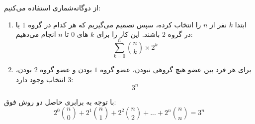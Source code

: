 \p
از دوگانه‌شماری استفاده می‌کنیم:
    \begin{enumerate}
        \item 
        ابتدا
$k$
         نفر از
$n$
          را انتخاب کرده، سپس تصمیم می‌گیریم که هر کدام در گروه 
$1$
         یا در گروه
$2$ 
    باشند. این کار را برای
$k$
         ‌های 
$0$ 
          تا
$n$ 
         انجام می‌دهیم:
        $$\sum_{k=0}^{n} {\binom{n}{k}\times2^k}$$
        \item
       برای هر فرد بین عضو هیچ گروهی نبودن، عضو گروه 
$1$ 
        بودن و عضو گروه 
$2$ 
        بودن،
$3$ 
        انتخاب وجود دارد:
        $$3^n$$
    \end{enumerate}
با توجه به برابری حاصل دو روش فوق:
 $$2^0\binom{n}{0}+2^1\binom{n}{1}+2^2\binom{n}{2}+...+2^n\binom{n}{n}= 3^n$$